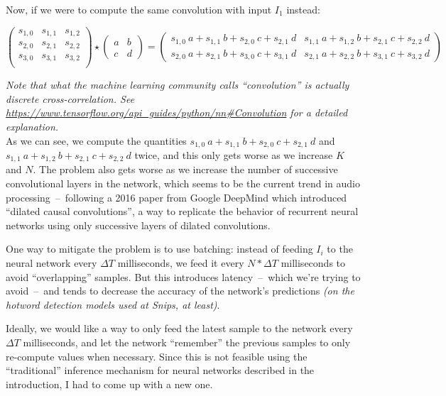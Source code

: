 \documentclass[11pt]{article}
\begin{document}
Now, if we were to compute the same convolution with input $I_1$ instead:

$$
\begin{pmatrix} 
s_{1,0} & s_{1,1} & s_{1,2} \\
s_{2,0} & s_{2,1} & s_{2,2} \\
s_{3,0} & s_{3,1} & s_{3,2} \\
\end{pmatrix}
\star
\begin{pmatrix} 
a & b \\
c & d 
\end{pmatrix}
=
\begin{pmatrix} 
s_{1,0} \ a + s_{1,1} \ b + s_{2,0} \ c + s_{2,1} \ d &
s_{1,1} \ a + s_{1,2} \ b + s_{2,1} \ c + s_{2,2} \ d \\
s_{2,0} \ a + s_{2,1} \ b + s_{3,0} \ c + s_{3,1} \ d &
s_{2,1} \ a + s_{2,2} \ b + s_{3,1} \ c + s_{3,2} \ d
\end{pmatrix}
$$
\vspace{.5em}

\textit{Note that what the machine learning community calls ``convolution'' is actually discrete cross-correlation. See \url{https://www.tensorflow.org/api_guides/python/nn#Convolution} for a detailed explanation.}\\

As we can see, we compute the quantities $s_{1,0} \ a + s_{1,1} \ b + s_{2,0} \ c + s_{2,1} \ d$ and $s_{1,1} \ a + s_{1,2} \ b + s_{2,1} \ c + s_{2,2} \ d$ twice, and this only gets worse as we increase $K$ and $N$. The problem also gets worse as we increase the number of successive convolutional layers in the network, which seems to be the current trend in audio processing~--~following a 2016 paper \cite{wavenet} from Google DeepMind which introduced ``dilated causal convolutions'', a way to replicate the behavior of recurrent neural networks using only successive layers of dilated convolutions.

One way to mitigate the problem is to use batching: instead of feeding $I_i$ to the neural network every $\Delta T$ milliseconds, we feed it every $N * \Delta T$ milliseconds to avoid ``overlapping'' samples. But this introduces latency~--~which we're trying to avoid~--~and tends to decrease the accuracy of the network's predictions \textit{(on the hotword detection models used at Snips, at least)}.

Ideally, we would like a way to only feed the latest sample to the network every $\Delta T$ milliseconds, and let the network ``remember'' the previous samples to only re-compute values when necessary. Since this is not feasible using the ``traditional'' inference mechanism for neural networks described in the introduction, I had to come up with a new one.
\end{document}

